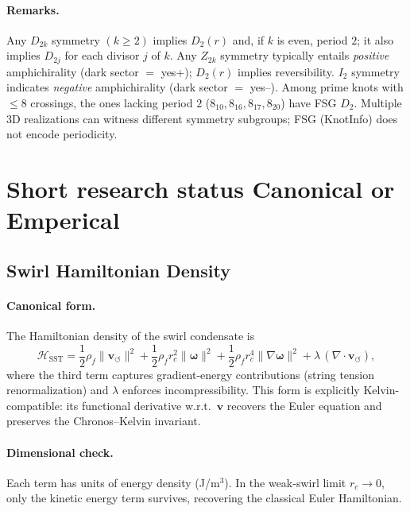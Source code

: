         \paragraph{Remarks.}
            Any $D_{2k}$ symmetry $(k\ge 2)$ implies $D_2(r)$ and, if $k$ is even, period $2$; it also implies $D_{2j}$ for each divisor $j$ of $k$. Any $Z_{2k}$ symmetry typically entails \emph{positive} amphichirality (dark sector $=$ yes+); $D_2(r)$ implies reversibility. $I_2$ symmetry indicates \emph{negative} amphichirality (dark sector $=$ yes--). Among prime knots with $\le 8$ crossings, the ones lacking period $2$ ($8_{10}, 8_{16}, 8_{17}, 8_{20}$) have FSG $D_2$. Multiple 3D realizations can witness different symmetry subgroups; FSG (KnotInfo) does not encode periodicity.

\section{Short research status Canonical or Emperical}
    \subsection{Swirl Hamiltonian Density}
        \label{canon58:appA}
        \paragraph{Canonical form.}
            The Hamiltonian density of the swirl condensate is
            \[
                \mathcal{H}_{\mathrm{SST}} =
                \frac{1}{2} \rho_{\!f} \lVert \mathbf{v}_{\!\boldsymbol{\circlearrowleft}}\rVert^2
                + \frac{1}{2} \rho_{\!f} r_c^{2} \lVert \boldsymbol{\omega} \rVert^{2}
                + \frac{1}{2} \rho_{\!f} r_c^{4} \lVert \nabla \boldsymbol{\omega} \rVert^{2}
                + \lambda\,(\nabla \cdot \mathbf{v}_{\!\boldsymbol{\circlearrowleft}}),
            \]
            where the third term captures gradient-energy contributions (string tension renormalization)
            and $\lambda$ enforces incompressibility. This form is explicitly Kelvin-compatible:
            its functional derivative w.r.t.\ $\mathbf{v}$ recovers the Euler equation and preserves
            the Chronos–Kelvin invariant.

        \paragraph{Dimensional check.}
            Each term has units of energy density (J/m$^3$). In the weak-swirl limit $r_c \to 0$,
            only the kinetic energy term survives, recovering the classical Euler Hamiltonian.

